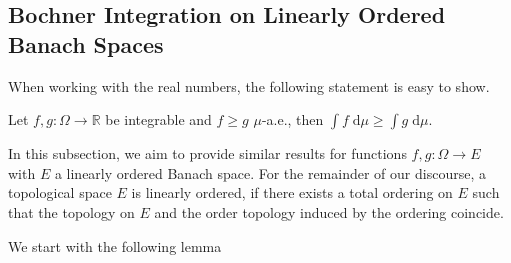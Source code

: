 \subsection{Bochner Integration on Linearly Ordered Banach Spaces}

When working with the real numbers, the following statement is easy to show.
\begin{center}
Let $f, g : \Omega \rightarrow \mathbb{R}$ be integrable and $f \ge g$ $\mu$-a.e., then $\int f\;\textrm{d} \mu \ge \int g\;\textrm{d} \mu$. 
\end{center}
In this subsection, we aim to provide similar results for functions $f, g : \Omega \rightarrow E$ with $E$ a linearly ordered Banach space. For the remainder of our discourse, a topological space $E$ is linearly ordered, if there exists a total ordering on $E$ such that the topology on $E$ and the order topology induced by the ordering coincide.

We start with the following lemma

